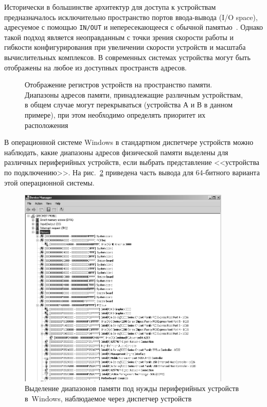 Исторически в большинстве архитектур для доступа к устройствам предназначалось исключительно пространство портов ввода-вывода (\abbr I/O space), адресуемое с помощью \texttt{IN/OUT} и непересекающееся с обычной памятью~\cite{cs473-io}. Однако такой подход является неоправданным с точки зрения скорости работы и гибкости конфигурирования при увеличении скорости устройств и масштаба вычислительных комплексов. В современных системах устройства могут быть отображены на любое из доступных пространств адресов.

\begin{figure}[htb]
    \centering
    \caption[Отображение регистров на пространство памяти]{Отображение регистров устройств на пространство памяти. Диапазоны адресов памяти, принадлежащие различным устройствам, в общем случае могут перекрываться (устройства А и В в данном примере), при этом необходимо определять приоритет их расположения}
    \label{fig:memmap}
\end{figure}

В операционной системе Windows в стандартном диспетчере устройств можно наблюдать, какие диапазоны адресов физической памяти выделены для различных периферийных устройств, если выбрать представление <<устройства по подключению>>. На рис.~\ref{fig:memmap-device-manager} приведена часть вывода для 64-битного варианта этой операционной системы.

\begin{figure}[htb]
    \centering
    \includegraphics[width=0.9\textwidth]{./memmap-device-manager}
    \caption[Выделение диапазонов памяти в~Windows]{Выделение диапазонов памяти под нужды периферийных устройств в~Windows, наблюдаемое через диспетчер устройств}
    \label{fig:memmap-device-manager}
\end{figure}


